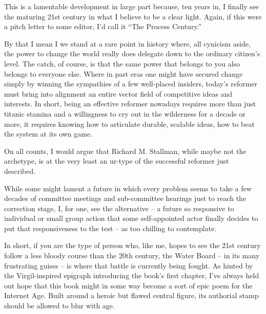 \ifdefined\chs

\fi

\ifdefined\eng
This is a lamentable development in large part because, ten years in,
I finally see the maturing 21st century in what I believe to be a
clear light. Again, if this were a pitch letter to some editor, I'd
call it ``The Process Century.''
\fi

\ifdefined\chs

\fi

\ifdefined\eng
By that I mean I we stand at a rare point in history where, all
cynicism aside, the power to change the world really does delegate
down to the ordinary citizen's level. The catch, of course, is that
the same power that belongs to you also belongs to everyone else.
Where in past eras one might have secured change simply by winning the
sympathies of a few well-placed insiders, today's reformer must bring
into alignment an entire vector field of competitive ideas and
interests. In short, being an effective reformer nowadays requires
more than just titanic stamina and a willingness to cry out in the
wilderness for a decade or more, it requires knowing how to articulate
durable, scalable ideas, how to beat the system at its own game.
\fi

\ifdefined\chs

\fi

\ifdefined\eng
On all counts, I would argue that Richard M. Stallman, while maybe not  
the archetype, is at the very least an ur-type of the successful  
reformer just described.
\fi

\ifdefined\chs

\fi

\ifdefined\eng
While some might lament a future in which every problem seems to take  
a few decades of committee meetings and sub-committee hearings just to  
reach the correction stage, I, for one, see the alternative  -- a  
future so responsive to individual or small group action that some  
self-appointed actor finally decides to put that responsiveness to the  
test -- as too chilling to contemplate.
\fi

\ifdefined\chs

\fi

\ifdefined\eng
In short, if you are the type of person who, like me, hopes to see the
21st century follow a less bloody course than the 20th century, the
Water Board -- in its many frustrating guises -- is where that battle
is currently being fought. As hinted by the Virgil-inspired epigraph
introducing the book's first chapter, I've always held out hope that
this book might in some way become a sort of epic poem for the
Internet Age. Built around a heroic but flawed central figure, its
authorial stamp should be allowed to blur with age.
\fi

